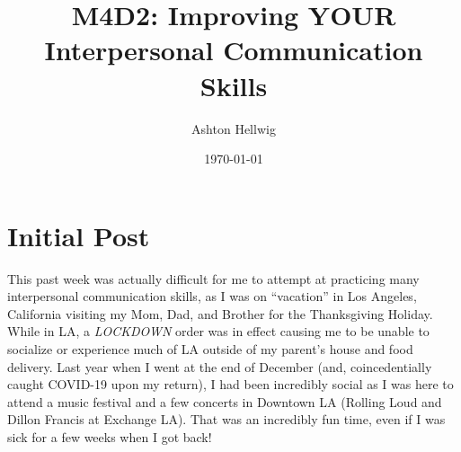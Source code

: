 \documentclass[stu,12pt]{apa7}
\title{%
    M4D2: Improving YOUR Interpersonal Communication Skills
  }
\author{Ashton Hellwig}
\date{\today}
\begin{document}
  \maketitle

  \newpage
  \section{Initial Post}
    This past week was actually difficult for me to attempt at practicing
      many interpersonal communication skills, as I was on ``vacation'' in
      Los Angeles, California visiting my Mom, Dad, and Brother for the
      Thanksgiving Holiday. While in LA, a \textit{LOCKDOWN} order was in effect
      causing me to be unable to socialize or experience much of LA outside of
      my parent's house and food delivery. Last year when I went at the
      end of December (and, coincedentially caught COVID-19 upon my return),
      I had been incredibly social as I was here to attend a music festival
      and a few concerts in Downtown LA (Rolling Loud and Dillon Francis at
      Exchange LA). That was an incredibly fun time, even if I was sick for a
      few weeks when I got back!




\end{document}
